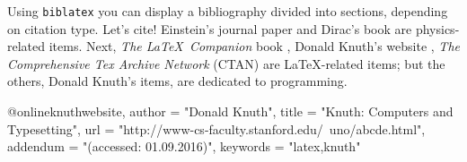 

\maketitle

Using \texttt{biblatex} you can display a bibliography divided 
into sections, depending on citation type. Let's cite! Einstein's 
journal paper \cite{einstein} and Dirac's book \cite{dirac} are 
physics-related items. Next, \textit{The \LaTeX\ Companion} book
 \cite{latexcompanion}, Donald Knuth's website \cite{knuthwebsite},
\textit{The Comprehensive Tex Archive Network} (CTAN) 
\cite{ctan} are \LaTeX-related items; but the others, Donald Knuth's items, 
\cite{knuth-fa,knuth-acp} are dedicated to programming. 

\medskip

\printbibliography



@online{knuthwebsite,
    author = "Donald Knuth",
    title = "Knuth: Computers and Typesetting",
    url  = "http://www-cs-faculty.stanford.edu/~uno/abcde.html",
    addendum = "(accessed: 01.09.2016)",
    keywords = "latex,knuth"
}